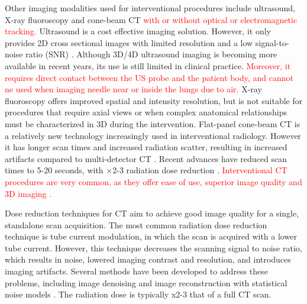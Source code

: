 Other imaging modalities used for interventional procedures include ultrasound, X-ray fluoroscopy and cone-beam CT \textcolor{red}{with or without optical or electromagnetic tracking.}
Ultrasound is a cost effective imaging solution. However, it only provides 2D cross sectional images with limited resolution and a low signal-to-noise ratio (SNR) \cite{sheafor2000comparison}. Although 3D/4D ultrasound imaging is becoming more available in recent years, its use is still limited in clinical practice. \textcolor{red}{Moreover, it requires direct contact between the US probe and the patient body, and cannot ne used when imaging needle near or inside the lungs due to air.}
X-ray fluoroscopy offers improved spatial and intensity resolution, but is not suitable for procedures that require axial views or when complex anatomical relationships must be characterized in 3D during the intervention.
Flat-panel cone-beam CT is a relatively new technology increasingly used in interventional radiology. However it has longer scan times and increased radiation scatter, resulting in increased artifacts compared to multi-detector CT \cite{orth2008cbct}. Recent advances have reduced scan times to 5-20 seconds, with $\times$2-3 radiation dose reduction \cite{dynact}.
\textcolor{red}{Interventional CT procedures are very common, as they offer ease of use, superior image quality and 3D imaging \cite{gupta2014ct}.}

Dose reduction techniques for CT aim to achieve good image quality for a single, standalone scan acquisition. The most common radiation dose reduction technique is tube current modulation, in which the scan is acquired with a lower tube current. However, this technique decreases the scanning signal to noise ratio, which results in noise, lowered imaging contrast and resolution, and introduces imaging artifacts. Several methods have been developed to address these problems, including image denoising \cite{manduca2009projection} and image reconstruction with statistical noise models  \cite{zhang2016statistical,kim2015sparseview,niu2014sparse,liu2014total}. The radiation dose is typically x2-3 that of a full CT scan. 

